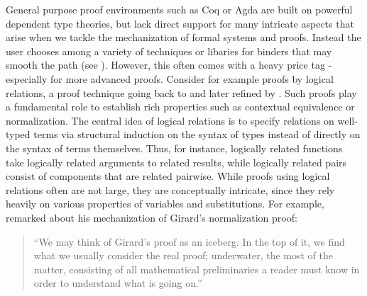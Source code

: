 General purpose proof environments such as Coq
\citep{bertot/casteran:2004} or Agda \citep{Norell:phd07} are built on
powerful dependent type theories, but lack direct support for many
intricate aspects that arise when we tackle the mechanization of
formal systems and proofs. Instead the user chooses among a variety of
techniques or libaries for binders that may smooth the path (see
\cite{Aydemir:TechReport09}). However, this often comes with a heavy price tag -
  especially for more advanced proofs.  Consider for example proofs by
  logical relations, a proof technique going back to \cite{Tait67} and
  later refined by \cite{GirardLafontTaylor:proofsAndTypes}.  Such
  proofs play a fundamental role to establish rich properties such as
  contextual equivalence or normalization.  The central idea of
  logical relations is to specify relations on well-typed terms via
  structural induction on the syntax of types instead of directly on
  the syntax of terms themselves. Thus, for instance, logically
  related functions take logically related arguments to related
  results, while logically related pairs consist of components that
  are related pairwise.  While proofs using logical relations often
  are not large, they are conceptually intricate, since they rely
  heavily on various properties of variables and substitutions.
%
%
For example,  \cite{Berardi:WLF90} remarked about his mechanization of Girard's normalization proof:
\begin{quote}
``We may think of Girard's proof as an iceberg. In the top of it, we find what we usually consider the real proof; underwater, the most  of the matter, consisting of all mathematical preliminaries a reader must know in order to understand what is going on.''
\end{quote}


